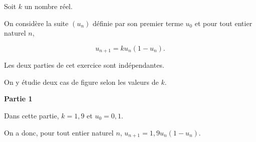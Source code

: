 \medskip

Soit $k$ un nombre réel.

On considère la suite $\left(u_n\right)$ définie par son premier terme $u_0$ et pour tout entier naturel $n$,

\[u_{n+1} = ku_n\left(1- u_n\right).\]

Les deux parties de cet exercice sont indépendantes. 

On y étudie deux cas de figure selon les valeurs de $k$.

\bigskip

\textbf{Partie 1}

\medskip

Dans cette partie, $k = 1,9$ et $u_0 = 0,1$.

On a donc,  pour tout entier naturel $n$,\: $u_{n+1} = 1,9u_n\left(1 - u_n\right)$.

\medskip

